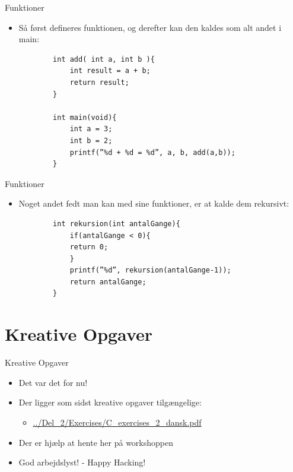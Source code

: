 \documentclass{beamer}
\begin{document}

\begin{frame}[fragile]{Funktioner}
	\begin{itemize}
		\item{Så først defineres funktionen, og derefter  kan den kaldes som alt andet i main:}
		\begin{lstlisting}
		int add( int a, int b ){
			int result = a + b;
			return result;
		}

		int main(void){
			int a = 3;
			int b = 2;
			printf(”%d + %d = %d”, a, b, add(a,b));
		}
		\end{lstlisting}
	\end{itemize}
\end{frame}


\begin{frame}[fragile]{Funktioner}
	\begin{itemize}
		\item{Noget andet fedt man kan med sine funktioner, er at kalde dem rekursivt:}
		\begin{lstlisting}
		int rekursion(int antalGange){
			if(antalGange < 0){
			return 0;
			}
			printf(”%d”, rekursion(antalGange-1));
			return antalGange;
		}
		\end{lstlisting}
	\end{itemize}
\end{frame}

\section{Kreative Opgaver}
\begin{frame}{Kreative Opgaver}
	\begin{itemize}
	\item{Det var det for nu!}
	\item{Der ligger som sidst kreative opgaver tilgængelige:}
		\begin{itemize}
		\item{\color{link}\href{https://github.com/Iakop/C-Programmering-for-begyndere/tree/master/Del_2/Exercises/C_exercises_2_dansk.pdf}{../Del\_2/Exercises/C\_exercises\_2\_dansk.pdf}}
		\end{itemize}
	\item{Der er hjælp at hente her på workshoppen}
	\item{God arbejdslyst! - Happy Hacking!}
	\end{itemize}
\end{frame}
\end{document}
